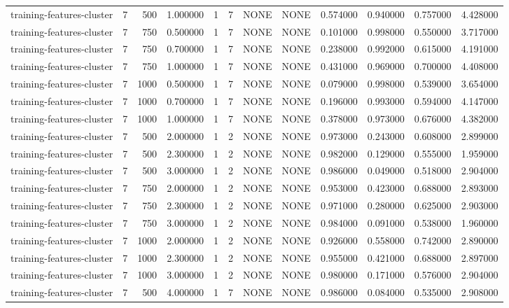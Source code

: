\begin{tabular}{lrrrllllrrrr}
training-features-cluster & 7 & 500 & 1.000000 & 1 & 7 & NONE & NONE & 0.574000 & 0.940000 & 0.757000 & 4.428000 \\
training-features-cluster & 7 & 750 & 0.500000 & 1 & 7 & NONE & NONE & 0.101000 & 0.998000 & 0.550000 & 3.717000 \\
training-features-cluster & 7 & 750 & 0.700000 & 1 & 7 & NONE & NONE & 0.238000 & 0.992000 & 0.615000 & 4.191000 \\
training-features-cluster & 7 & 750 & 1.000000 & 1 & 7 & NONE & NONE & 0.431000 & 0.969000 & 0.700000 & 4.408000 \\
training-features-cluster & 7 & 1000 & 0.500000 & 1 & 7 & NONE & NONE & 0.079000 & 0.998000 & 0.539000 & 3.654000 \\
training-features-cluster & 7 & 1000 & 0.700000 & 1 & 7 & NONE & NONE & 0.196000 & 0.993000 & 0.594000 & 4.147000 \\
training-features-cluster & 7 & 1000 & 1.000000 & 1 & 7 & NONE & NONE & 0.378000 & 0.973000 & 0.676000 & 4.382000 \\
training-features-cluster & 7 & 500 & 2.000000 & 1 & 2 & NONE & NONE & 0.973000 & 0.243000 & 0.608000 & 2.899000 \\
training-features-cluster & 7 & 500 & 2.300000 & 1 & 2 & NONE & NONE & 0.982000 & 0.129000 & 0.555000 & 1.959000 \\
training-features-cluster & 7 & 500 & 3.000000 & 1 & 2 & NONE & NONE & 0.986000 & 0.049000 & 0.518000 & 2.904000 \\
training-features-cluster & 7 & 750 & 2.000000 & 1 & 2 & NONE & NONE & 0.953000 & 0.423000 & 0.688000 & 2.893000 \\
training-features-cluster & 7 & 750 & 2.300000 & 1 & 2 & NONE & NONE & 0.971000 & 0.280000 & 0.625000 & 2.903000 \\
training-features-cluster & 7 & 750 & 3.000000 & 1 & 2 & NONE & NONE & 0.984000 & 0.091000 & 0.538000 & 1.960000 \\
training-features-cluster & 7 & 1000 & 2.000000 & 1 & 2 & NONE & NONE & 0.926000 & 0.558000 & 0.742000 & 2.890000 \\
training-features-cluster & 7 & 1000 & 2.300000 & 1 & 2 & NONE & NONE & 0.955000 & 0.421000 & 0.688000 & 2.897000 \\
training-features-cluster & 7 & 1000 & 3.000000 & 1 & 2 & NONE & NONE & 0.980000 & 0.171000 & 0.576000 & 2.904000 \\
training-features-cluster & 7 & 500 & 4.000000 & 1 & 7 & NONE & NONE & 0.986000 & 0.084000 & 0.535000 & 2.908000 \\

\end{tabular}
